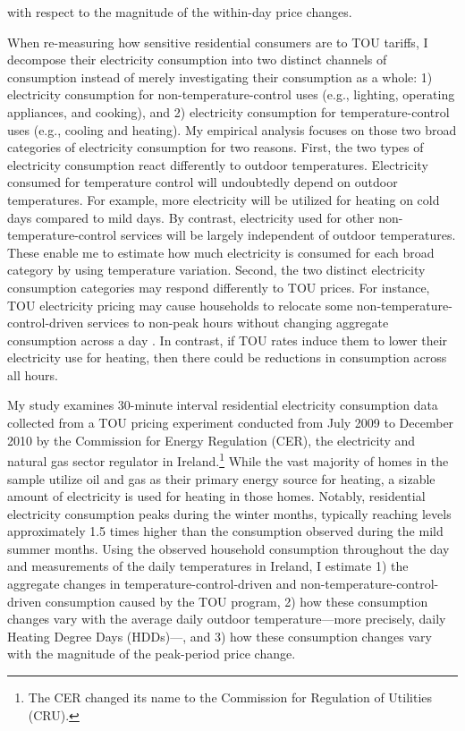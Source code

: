 with respect to the magnitude of the within-day price changes. 

When re-measuring how sensitive residential consumers are to TOU tariffs, I decompose their electricity consumption into two distinct channels of consumption instead of merely investigating their consumption as a whole: 1) electricity consumption for non-temperature-control uses (e.g., lighting, operating appliances, and cooking), and 2) electricity consumption for temperature-control uses (e.g., cooling and heating). My empirical analysis focuses on those two broad categories of electricity consumption for two reasons. First, the two types of electricity consumption react differently to outdoor temperatures. Electricity consumed for temperature control will undoubtedly depend on outdoor temperatures. For example, more electricity will be utilized for heating on cold days compared to mild days. By contrast, electricity used for other non-temperature-control services will be largely independent of outdoor temperatures. These enable me to estimate how much electricity is consumed for each broad category by using temperature variation. Second, the two distinct electricity consumption categories may respond differently to TOU prices. For instance, TOU electricity pricing may cause households to relocate some non-temperature-control-driven services to non-peak hours without changing aggregate consumption across a day \citep{Residential-Response-to-Critical-Peak-Pricing-of-Electricity_California-Evidence_Herter-and-Wayland_2010, Empowering-Consumers-through-Data-and-Smart-Technology_HML_2016}. In contrast, if TOU rates induce them to lower their electricity use for heating, then there could be reductions in consumption across all hours. 

My study examines 30-minute interval residential electricity consumption data collected from a TOU pricing experiment conducted from July 2009 to December 2010 by the Commission for Energy Regulation (CER), the electricity and natural gas sector regulator in Ireland.\footnote{The CER changed its name to the Commission for Regulation of Utilities (CRU).} While the vast majority of homes in the sample utilize oil and gas as their primary energy source for heating, a sizable amount of electricity is used for heating in those homes. Notably, residential electricity consumption peaks during the winter months, typically reaching levels approximately 1.5 times higher than the consumption observed during the mild summer months. Using the observed household consumption throughout the day and measurements of the daily temperatures in Ireland, I estimate 1) the aggregate changes in temperature-control-driven and non-temperature-control-driven consumption caused by the TOU program, 2) how these consumption changes vary with the average daily outdoor temperature---more precisely, daily Heating Degree Days (HDDs)---, and 3) how these consumption changes vary with the magnitude of the peak-period price change.  

